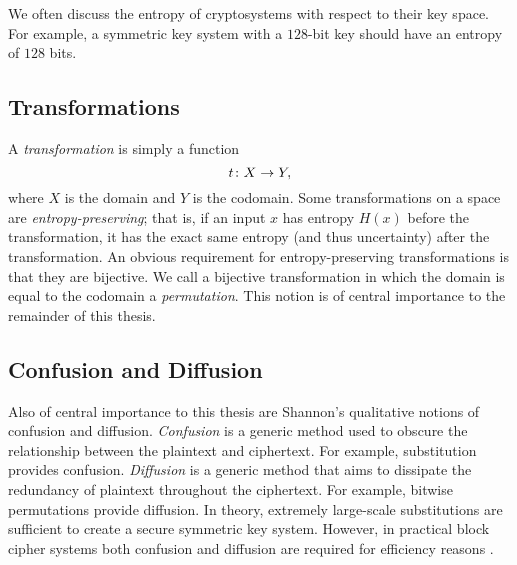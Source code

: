 We often discuss the entropy of cryptosystems with respect to their key space.
For example, a symmetric key system with a $128$-bit key should have an entropy of $128$ bits.

\subsection{Transformations}
A \emph{transformation} is simply a function
\begin{equation*}
t \colon X \rightarrow Y,
\end{equation*} 
where $X$ is the domain and $Y$ is the codomain.
Some transformations on a space are \emph{entropy-preserving}; that is, if an input $x$ has entropy $H(x)$ before the transformation, it has the exact same entropy (and thus uncertainty) after the transformation.
An obvious requirement for entropy-preserving transformations is that they are bijective.
We call a bijective transformation in which the domain is equal to the codomain a \emph{permutation}. 
This notion is of central importance to the remainder of this thesis.

\subsection{Confusion and Diffusion}
Also of central importance to this thesis are Shannon's qualitative notions of confusion and diffusion.
\emph{Confusion} is a generic method used to obscure the relationship between the plaintext and ciphertext.
For example, substitution provides confusion.
\emph{Diffusion} is a generic method that aims to dissipate the redundancy of plaintext throughout the ciphertext.
For example, bitwise permutations provide diffusion.
In theory, extremely large-scale substitutions are sufficient to create a secure symmetric key system.
However, in practical block cipher systems both confusion and diffusion are required for efficiency reasons \cite{Schneier1996_Applied}.

